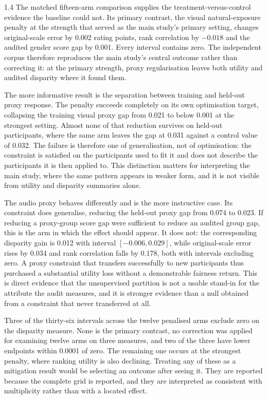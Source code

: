 \begin{spacing}{1.4}
The matched fifteen-arm comparison supplies the treatment-versus-control evidence the
baseline could not. Its primary contrast, the visual natural-exposure penalty at the
strength that served as the main study's primary setting, changes original-scale error by
0.002 rating points, rank correlation by $-0.018$ and the audited gender score gap by
0.001. Every interval contains zero. The independent corpus therefore reproduces the
main study's central outcome rather than correcting it: at the primary strength, proxy
regularisation leaves both utility and audited disparity where it found them.

The more informative result is the separation between training and held-out proxy response.
The penalty succeeds completely on its own optimisation target, collapsing the training
visual proxy gap from 0.021 to below 0.001 at the strongest setting. Almost none of that
reduction survives on held-out participants, where the same arm leaves the gap at 0.031
against a control value of 0.032. The failure is therefore one of generalisation, not of
optimisation: the constraint is satisfied on the participants used to fit it and does not
describe the participants it is then applied to. This distinction matters for interpreting
the main study, where the same pattern appears in weaker form, and it is not visible from
utility and disparity summaries alone.

The audio proxy behaves differently and is the more instructive case. Its constraint does
generalise, reducing the held-out proxy gap from 0.074 to 0.023. If reducing a proxy-group
score gap were sufficient to reduce an audited group gap, this is the arm in which the
effect should appear. It does not: the corresponding disparity gain is 0.012 with interval
$[-0.006, 0.029]$, while original-scale error rises by 0.034 and rank correlation falls by
0.178, both with intervals excluding zero. A proxy constraint that transfers successfully
to new participants thus purchased a substantial utility loss without a demonstrable
fairness return. This is direct evidence that the unsupervised partition is not a usable
stand-in for the attribute the audit measures, and it is stronger evidence than a null
obtained from a constraint that never transferred at all.

Three of the thirty-six intervals across the twelve penalised arms exclude zero on the
disparity measure. None is the primary contrast, no correction was applied for examining
twelve arms on three measures, and two of the three have lower endpoints within 0.0001 of
zero. The remaining one occurs at the strongest penalty, where ranking utility is also
declining. Treating any of these as a mitigation result would be selecting an outcome
after seeing it. They are reported because the complete grid is reported, and they are
interpreted as consistent with multiplicity rather than with a located effect.


\end{spacing}
